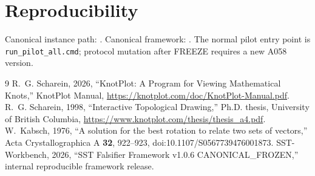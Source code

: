 \documentclass[11pt,a4paper]{article}
\newcommand{\code}[1]{\texttt{#1}}
\begin{document}
\section{Reproducibility}
Canonical instance path: . Canonical framework: . The normal pilot entry point is \code{run_pilot_all.cmd}; protocol mutation after FREEZE requires a new A058 version.
\begin{thebibliography}{9}
 R.~G. Scharein, 2026, ``KnotPlot: A Program for Viewing Mathematical Knots,'' KnotPlot Manual, \url{https://knotplot.com/doc/KnotPlot-Manual.pdf}.
 R.~G. Scharein, 1998, ``Interactive Topological Drawing,'' Ph.D. thesis, University of British Columbia, \url{https://www.knotplot.com/thesis/thesis_a4.pdf}.
 W.~Kabsch, 1976, ``A solution for the best rotation to relate two sets of vectors,'' Acta Crystallographica A \textbf{32}, 922--923, doi:10.1107/S0567739476001873.
 SST-Workbench, 2026, ``SST Falsifier Framework v1.0.6 CANONICAL\_FROZEN,'' internal reproducible framework release.
\end{thebibliography}
\end{document}
